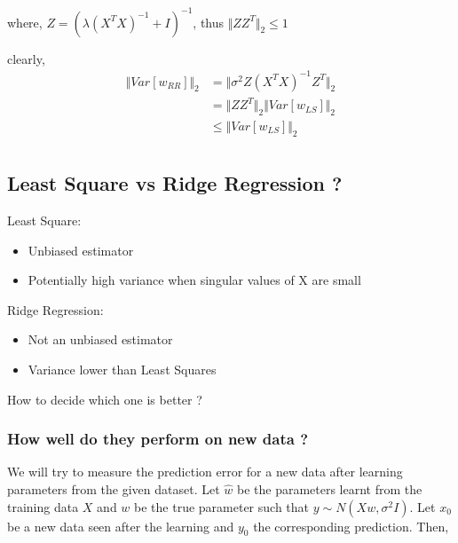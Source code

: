 \documentclass{article}
\begin{document}
where, $Z = (\lambda (X^TX)^{-1} + I)^{-1}$, thus $\Vert ZZ^T \Vert_2 \leq 1$

clearly,
\begin{align*}
    \Vert Var[w_{RR}] \Vert_2 &= \Vert \sigma^2 Z (X^T X)^{-1} Z^T \Vert_2\\
    & = \Vert ZZ^T \Vert_2 \Vert Var[w_{LS}] \Vert_2\\
    & \leq \Vert Var[w_{LS}] \Vert_2\\
\end{align*}

\subsubsection{}
\subsubsection{}


\subsection{Least Square vs Ridge Regression ?}

Least Square:
\begin{itemize}
    \item Unbiased estimator
    \item Potentially high variance when singular values of X are small
\end{itemize}
\newpara
Ridge Regression:
\begin{itemize}
    \item Not an unbiased estimator
    \item Variance lower than Least Squares
\end{itemize}
\newpara
How to decide which one is better ?

\subsubsection{How well do they perform on new data ?}
We will try to measure the prediction error for a new data after learning parameters from the given dataset. Let $\hat{w}$ be the parameters learnt from the training data $X$ and $w$ be the true parameter such that $y \sim N(Xw, \sigma^2I)$. Let $x_0$ be a new data seen after the learning and $y_0$ the corresponding prediction. Then,
\end{document}
